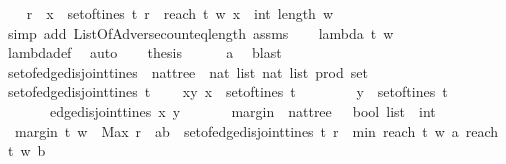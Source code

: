 \begin{isabellebody}
\ \ \isamarkupfalse%
\ {\isachardoublequoteopen}{\isacharbraceleft}r{\isachardot}\ {\isasymexists}\ x\ {\isasymin}\ set{\isacharunderscore}of{\isacharunderscore}tines\ t{\isachardot}\ r\ {\isacharequal}\ reach\ t\ w\ x{\isacharbraceright}\ {\isacharequal}\ {\isacharbraceleft}int\ {\isacharparenleft}length\ w{\isacharparenright}{\isacharbraceright}{\isachardoublequoteclose}\isanewline
\ \ \ \ \isamarkupfalse%
\ {\isacharparenleft}simp\ add{\isacharcolon}\ ListOfAdverse{\isacharunderscore}count{\isacharunderscore}eq{\isacharunderscore}length\ assms{\isacharparenright}\isanewline
\ \ \isamarkupfalse%
\ {\isachardoublequoteopen}lambda\ t\ w\ {\isasymge}\ {}{\isachardoublequoteclose}\isanewline
\ \ \ \ \isamarkupfalse%
\ lambda{\isacharunderscore}def\ \isamarkupfalse%
\ auto\isanewline
\ \ \isamarkupfalse%
\ {\isacharquery}thesis\isanewline
\ \ \ \ \isamarkupfalse%
\ a\ \isamarkupfalse%
\ blast\ \isanewline
\ \isamarkupfalse%
%
\endisatagproof
{\isafoldproof}%
%
\isadelimproof
\isanewline
%
\endisadelimproof
\ \ \ \isanewline
{}\isamarkupfalse%
\ set{\isacharunderscore}of{\isacharunderscore}edge{\isacharunderscore}disjoint{\isacharunderscore}tines\ {\isacharcolon}{\isacharcolon}\ {\isachardoublequoteopen}nattree\ {\isasymRightarrow}\ {\isacharparenleft}{\isacharparenleft}nat\ list{\isacharcomma}\ nat\ list{\isacharparenright}\ prod{\isacharparenright}\ set{\isachardoublequoteclose}\ \isanewline
\ {\isachardoublequoteopen}set{\isacharunderscore}of{\isacharunderscore}edge{\isacharunderscore}disjoint{\isacharunderscore}tines\ t\isanewline
\ \ \ {\isacharequal}\ {\isacharbraceleft}{\isacharparenleft}x{\isacharcomma}y{\isacharparenright}{\isachardot}\ x\ {\isasymin}\ set{\isacharunderscore}of{\isacharunderscore}tines\ t\ \isanewline
\ \ \ \ \ \ {\isasymand}\ y\ {\isasymin}\ set{\isacharunderscore}of{\isacharunderscore}tines\ t\isanewline
\ \ \ \ \ \ {\isasymand}\ edge{\isacharunderscore}disjoint{\isacharunderscore}tines\ x\ y{\isacharbraceright}{\isachardoublequoteclose}\ \isanewline
\ \ \ \ \isanewline
{}\isamarkupfalse%
\ margin\ {\isacharcolon}{\isacharcolon}\ {\isachardoublequoteopen}nattree\ {\isasymRightarrow}\ \ bool\ list\ {\isasymRightarrow}\ int{\isachardoublequoteclose}\ \isanewline
\ \ {\isachardoublequoteopen}margin\ t\ w\ {\isacharequal}\ Max\ {\isacharbraceleft}r{\isachardot}\ {\isacharparenleft}{\isasymexists}\ {\isacharparenleft}a{\isacharcomma}b{\isacharparenright}\ {\isasymin}\ set{\isacharunderscore}of{\isacharunderscore}edge{\isacharunderscore}disjoint{\isacharunderscore}tines\ t{\isachardot}\ r\ {\isacharequal}\ min\ {\isacharparenleft}reach\ t\ w\ a{\isacharparenright}\ {\isacharparenleft}reach\ t\ w\ b{\isacharparenright}{\isacharparenright}{\isacharbraceright}{\isachardoublequoteclose}\isanewline

\end{isabellebody}
